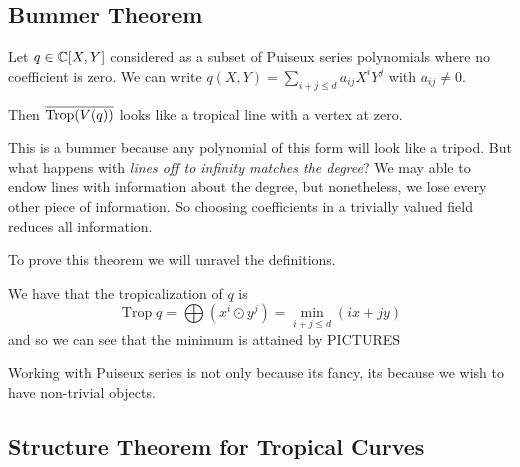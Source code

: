 \documentclass[12pt]{memoir}
\DeclareMathOperator{\Trop}{Trop}
\theoremstyle{definition}
\begin{document}
\subsection{Bummer Theorem}

\begin{Th} 
    Let $q\in\mathbb{C}[X,Y]$ considered as a subset of Puiseux series polynomials where no coefficient is zero. We can write $q(X,Y)=\sum_{i+j\leq d}a_{ij}X^iY^j$ with $a_{ij}\neq 0$.\par 
    Then $\ov{\Trop(V(q))}$ looks like a tropical line with a vertex at zero.
\end{Th}

This is a bummer because any polynomial of this form will look like a tripod. But what happens with \emph{lines off to infinity matches the degree}? We may able to endow lines with information about the degree, but nonetheless, we lose every other piece of information. So choosing coefficients in a trivially valued field reduces all information.\par 
To prove this theorem we will unravel the definitions.

\begin{ptcbp}
We have that the tropicalization of $q$ is 
$$\Trop q=\bigoplus(x^i\odot y^j)=\min_{i+j\leq d}(ix+jy)$$
and so we can see that the minimum is attained by PICTURES
\end{ptcbp}

Working with Puiseux series is not only because its fancy, its because we wish to have non-trivial objects.

\subsection{Structure Theorem for Tropical Curves}
\end{document}
